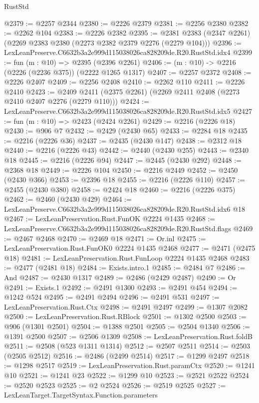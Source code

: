 \begin{lexlean}{RustStd}
\begin{coremodule}
@2379 := @2257 @2344
@2380 := @2226 @2379
@2381 := @2256 @2380
@2382 := @2262 @104
@2383 := @2226 @2382
@2395 := @2381 @2383 (@2347 @2261) (@2269 @2383 @2380 (@2273 @2382 @2379 @2276 (@2279 @104)))
@2396 := LexLeanPreserve.C6632b3a2e999d115038026ca828209de.R20.RustStd.idx4
@2399 := fun (m : @10) => @2395 (@2396 @2261)
@2406 := (m : @10) -> @2216 (@2226 (@2236 @375)) (@2222 @1265 @1317)
@2407 := @2257 @2372
@2408 := @2226 @2407
@2409 := @2256 @2408
@2410 := @2262 @110
@2411 := @2226 @2410
@2423 := @2409 @2411 (@2375 @2261) (@2269 @2411 @2408 (@2273 @2410 @2407 @2276 (@2279 @110)))
@2424 := LexLeanPreserve.C6632b3a2e999d115038026ca828209de.R20.RustStd.idx5
@2427 := fun (m : @10) => @2423 (@2424 @2261)
@2429 := @2216 (@2226 @18)
@2430 := @906 @7
@2432 := @2429 (@2430 @65)
@2433 := @2284 @18
@2435 := @2216 (@2226 @36)
@2437 := @2435 (@2430 @147)
@2438 := @2312 @18
@2440 := @2216 (@2226 @43)
@2442 := @2440 (@2430 @255)
@2443 := @2340 @18
@2445 := @2216 (@2226 @94)
@2447 := @2445 (@2430 @292)
@2448 := @2368 @18
@2449 := @2226 @104
@2450 := @2216 @2449
@2452 := @2450 (@2430 @366)
@2453 := @2396 @18
@2455 := @2216 (@2226 @110)
@2457 := @2455 (@2430 @380)
@2458 := @2424 @18
@2460 := @2216 (@2226 @375)
@2462 := @2460 (@2430 @429)
@2464 := LexLeanPreserve.C6632b3a2e999d115038026ca828209de.R20.RustStd.idx6 @18
@2467 := LexLeanPreservation.Rust.FunOK @2224 @1435
@2468 := LexLeanPreserve.C6632b3a2e999d115038026ca828209de.R20.RustStd.flags
@2469 := @2467 @2468
@2470 := @2469 @18
@2471 := Or.inl
@2475 := LexLeanPreservation.Rust.FunOK0 @2224 @1435 @2468
@2477 := @2471 (@2475 @18)
@2481 := LexLeanPreservation.Rust.FunLoop @2224 @1435 @2468
@2483 := @2477 (@2481 @18)
@2484 := Exists.intro.{1}
@2485 := @2484 @7
@2486 := And
@2487 := @2430 @1317
@2489 := @2486 (@2429 @2487)
@2490 := Or
@2491 := Exists.{1}
@2492 := @2491 @1300
@2493 := @2491 @454
@2494 := @1242 @524
@2495 := @2491 @2494
@2496 := @2491 @531
@2497 := LexLeanPreservation.Rust.Ctx
@2498 := @2491 @2497
@2499 := @1307 @2082
@2500 := LexLeanPreservation.Rust.RBlock
@2501 := @1302 @2500
@2503 := @906 (@1301 @2501)
@2504 := @1388 @2501
@2505 := @2504 @1340
@2506 := @1391 @2500
@2507 := @2506 @1309
@2508 := LexLeanPreservation.Rust.foldB
@2511 := @2508 (@523 @1311 @1314)
@2512 := @2507 @2511
@2514 := @2503 (@2505 @2512)
@2516 := @2486 (@2499 @2514)
@2517 := @1299 @2497
@2518 := @1298 @2517
@2519 := LexLeanPreservation.Rust.paramCtx
@2520 := @1241 @10
@2521 := @1241 @23
@2522 := @1299 @10
@2523 := @2521 @2522
@2524 := @2520 @2523
@2525 := @2 @2524
@2526 := @2519 @2525
@2527 := LexLeanTarget.TargetSyntax.Function.parameters

\end{coremodule}
\end{lexlean}

